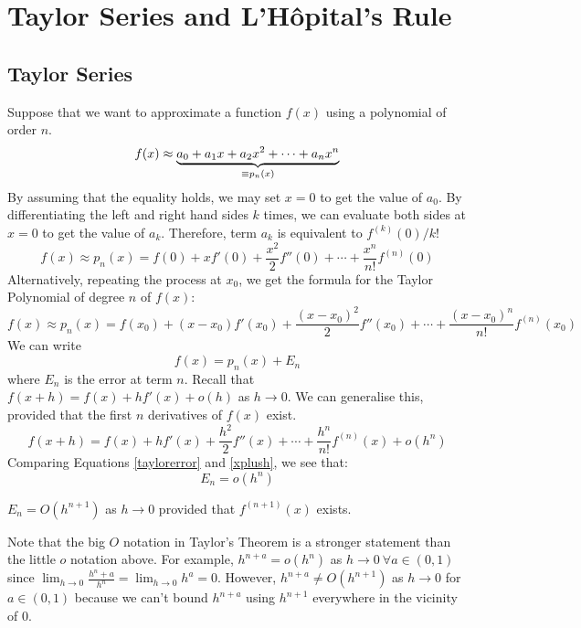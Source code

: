 \documentclass{article}
\begin{document}
	\section{Taylor Series and L'H\^opital's Rule}
	\subsection{Taylor Series}
	Suppose that we want to approximate a function $f(x)$ using a polynomial of order $n$.
	\[ f(x) \approx \underbrace{a_0 + a_1x + a_2x^2 + \cdots + a_nx^n}_{\mathclap{\equiv p_n(x)}} \]
	By assuming that the equality holds, we may set $x=0$ to get the value of $a_0$. By differentiating the left and right hand sides $k$ times, we can evaluate both sides at $x=0$ to get the value of $a_k$. Therefore, term $a_k$ is equivalent to $f^{(k)}(0)/k!$
	\[ f(x) \approx p_n(x) = f(0) + xf'(0) + \frac{x^2}{2}f''(0) + \cdots + \frac{x^n}{n!}f^{(n)}(0) \]
	Alternatively, repeating the process at $x_0$, we get the formula for the Taylor Polynomial of degree $n$ of $f(x)$:
	\[ f(x) \approx p_n(x) = f(x_0) + (x-x_0)f'(x_0) + \frac{(x-x_0)^2}{2}f''(x_0) + \cdots + \frac{(x-x_0)^n}{n!}f^{(n)}(x_0) \]
	We can write
	\begin{equation}\label{taylorerror}
		f(x) = p_n(x) + E_n
	\end{equation}
	where $E_n$ is the error at term $n$. Recall that $f(x+h) = f(x) + hf'(x) + o(h)$ as $h \to 0$. We can generalise this, provided that the first $n$ derivatives of $f(x)$ exist.
	\begin{equation}\label{xplush}
		f(x+h) = f(x) + hf'(x) + \frac{h^2}{2}f''(x) + \cdots + \frac{h^n}{n!}f^{(n)}(x) + o(h^n)
	\end{equation}
	Comparing Equations \eqref{taylorerror} and \eqref{xplush}, we see that:
	\[ E_n = o(h^n) \]
	\begin{theorem}
		$E_n = O(h^{n+1})$ as $h \to 0$ provided that $f^{(n+1)}(x)$ exists.
	\end{theorem}
	Note that the big $O$ notation in Taylor's Theorem is a stronger statement than the little $o$ notation above. For example, $h^{n+a}=o(h^n)$ as $h \to 0\ \forall a \in (0, 1)$ since $\lim_{h\to 0} \frac{h^n+a}{h^n} = \lim_{h\to 0} h^a = 0$. However, $h^{n+a} \neq O(h^{n+1})$ as $h \to 0$ for $a \in (0, 1)$ because we can't bound $h^{n+a}$ using $h^{n+1}$ everywhere in the vicinity of $0$.
	
\end{document}
